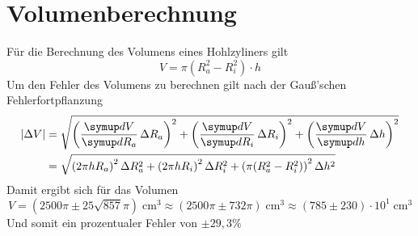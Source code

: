 \documentclass[titlepage = firstcover]{scrartcl}
\begin{document}
\section{Volumenberechnung}
Für die Berechnung des Volumens eines Hohlzyliners gilt 
\begin{equation*}
    V = \pi (R_a^2 - R_i^2) \cdot h
\end{equation*}
Um den Fehler des Volumens zu berechnen gilt nach der Gauß'schen Fehlerfortpflanzung
\begin{align*}
    |\Delta V|&= \sqrt{ \left( \dif{V}{R_a} \Delta R_a \right)^2 + \left( \dif{V}{R_i} \Delta R_i \right)^2  + \left( \dif{V}{h} \Delta h \right)^2 } \\
              &= \sqrt{ \left( 2\pi h R_a  \right)^2 \Delta R_a^2 + \left( 2\pi h R_i \right)^2 \Delta R_i ^2 + \left( \pi (R_a^2 - R_i^2 )\right)^2 \Delta h^2 }
\end{align*}
Damit ergibt sich für das Volumen
\begin{equation*}
    V = \left(2500\pi \pm 25\sqrt{857}\pi\right) \; \text{cm}^3 ≈  \left(2500\pi \pm 732 \pi\right) \; \text{cm}^3 ≈  \left(785 \pm 230\right)\cdot 10^{1} \; \text{cm}^3
\end{equation*}
Und somit ein prozentualer Fehler von $\pm 29,3\%$

\newpage
\end{document}
